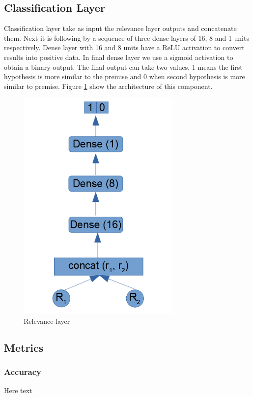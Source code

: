 \documentclass[12pt]{report}
\begin{document}
\subsection{Classification Layer}

Classification layer take as input the relevance layer outputs and concatenate them. Next it is following by a sequence of three dense layers of 16, 8 and 1 units respectively. Dense layer with 16 and 8 units have a \ac{ReLU} activation to convert results into positive data. In final dense layer we use a sigmoid activation to obtain a binary output. The final output can take two values, 1 means the first hypothesis is more similar to the premise and 0 when second hypothesis is more similar to premise. Figure \ref{figure:classification} show the architecture of this component.

\begin{figure}[H]	
	\centering
	\includegraphics[width=80mm, scale = 1]{images/15_classification.png}	
	\caption{Relevance layer}	
	\label{figure:classification}
\end{figure}

\subsection{Metrics}
\subsubsection{Accuracy}
Here text
\end{document}
